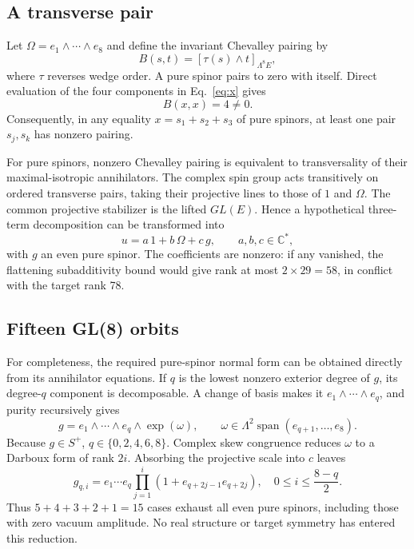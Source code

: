 \documentclass[aps,pra,reprint,groupedaddress,nofootinbib,longbibliography]{revtex4-2}
\newcommand{\C}{\mathbb{C}}
\newcommand{\Span}{\operatorname{span}}
\begin{document}
\subsection{A transverse pair}

Let $\Omega=e_1\wedge\cdots\wedge e_8$ and define the invariant Chevalley
pairing by
\begin{equation}
 B(s,t)=[\tau(s)\wedge t]_{\Lambda^8E},
 \label{eq:chevalley}
\end{equation}
where $\tau$ reverses wedge order.  A pure spinor pairs to zero with itself.
Direct evaluation of the four components in Eq.~\eqref{eq:x} gives
\begin{equation}
 B(x,x)=4\ne0 .
 \label{eq:target-pairing}
\end{equation}
Consequently, in any equality $x=s_1+s_2+s_3$ of pure spinors, at least one
pair $s_j,s_k$ has nonzero pairing.

For pure spinors, nonzero Chevalley pairing is equivalent to transversality of
their maximal-isotropic annihilators.  The complex spin group acts transitively
on ordered transverse pairs, taking their projective lines to those of $1$ and
$\Omega$.  The common projective stabilizer is the lifted $GL(E)$.  Hence a
hypothetical three-term decomposition can be transformed into
\begin{equation}
 u=a\,1+b\,\Omega+c\,g,
 \qquad a,b,c\in\C^*,
 \label{eq:three-normal}
\end{equation}
with $g$ an even pure spinor.  The coefficients are nonzero: if any vanished,
the flattening subadditivity bound would give rank at most $2\times29=58$, in
conflict with the target rank 78.

\subsection{Fifteen GL(8) orbits}

For completeness, the required pure-spinor normal form can be obtained directly
from its annihilator equations.  If $q$ is the lowest nonzero exterior degree
of $g$, its degree-$q$ component is decomposable.  A change of basis makes it
$e_1\wedge\cdots\wedge e_q$, and purity recursively gives
\begin{equation}
 g=e_1\wedge\cdots\wedge e_q\wedge\exp(\omega),
 \qquad
 \omega\in\Lambda^2\Span(e_{q+1},\ldots,e_8).
 \label{eq:pure-normal-general}
\end{equation}
Because $g\in S^+$, $q\in\{0,2,4,6,8\}$.  Complex skew congruence reduces
$\omega$ to a Darboux form of rank $2i$.  Absorbing the projective scale into
$c$ leaves
\begin{equation}
 g_{q,i}=e_1\cdots e_q
 \prod_{j=1}^{i}\left(1+e_{q+2j-1}e_{q+2j}\right),
 \quad 0\le i\le\frac{8-q}{2}.
 \label{eq:gqi}
\end{equation}
Thus $5+4+3+2+1=15$ cases exhaust all even pure spinors, including those with
zero vacuum amplitude.  No real structure or target symmetry has entered this
reduction.
\end{document}
